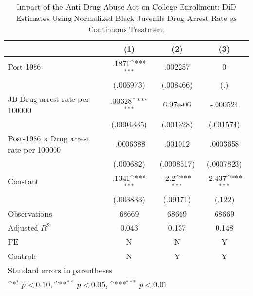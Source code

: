 \begin{table}[htbp]\centering
\def\sym#1{\ifmmode^{#1}\else\(^{#1}\)\fi}
\caption{Impact of the Anti-Drug Abuse Act on College Enrollment: DiD Estimates Using Normalized Black Juvenile Drug Arrest Rate as Continuous Treatment}
\begin{tabular}{l*{3}{c}}
\hline\hline
                    &\multicolumn{1}{c}{(1)}         &\multicolumn{1}{c}{(2)}         &\multicolumn{1}{c}{(3)}         \\
\hline
Post-1986           &       .1871\sym{***}&     .002257         &           0         \\
                    &   (.006973)         &   (.008466)         &         (.)         \\
[1em]
JB Drug arrest rate per 100000&      .00328\sym{***}&    6.97e-06         &    -.000524         \\
                    &  (.0004335)         &   (.001328)         &   (.001574)         \\
[1em]
Post-1986 x Drug arrest rate per 100000&   -.0006388         &     .001012         &    .0003658         \\
                    &   (.000682)         &  (.0008617)         &  (.0007823)         \\
[1em]
Constant            &       .1341\sym{***}&        -2.2\sym{***}&      -2.437\sym{***}\\
                    &   (.003833)         &    (.09171)         &      (.122)         \\
\hline
Observations        &       68669         &       68669         &       68669         \\
Adjusted \(R^{2}\)  &       0.043         &       0.137         &       0.148         \\
FE                  &           N         &           N         &           Y         \\
Controls            &           N         &           Y         &           Y         \\
\hline\hline
\multicolumn{4}{l}{\footnotesize Standard errors in parentheses}\\
\multicolumn{4}{l}{\footnotesize \sym{*} \(p<0.10\), \sym{**} \(p<0.05\), \sym{***} \(p<0.01\)}\\
\end{tabular}
\end{table}
